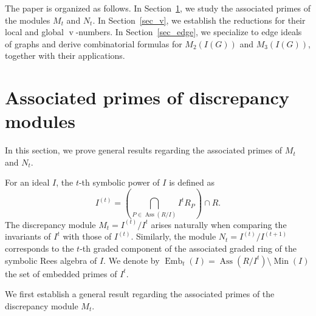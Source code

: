 \documentclass[12pt]{amsart}
\def\v{\operatorname{v}}
\begin{document}
The paper is organized as follows. In Section~\ref{sec_assoc}, we study the associated primes of the modules $M_t$ and $N_t$. In Section~\ref{sec_v}, we establish the reductions for their local and global $\v$-numbers. In Section~\ref{sec_edge}, we specialize to edge ideals of graphs and derive combinatorial formulas for $M_2(I(G))$ and $M_3(I(G))$, together with their applications.



\section{Associated primes of discrepancy modules}\label{sec_assoc}
In this section, we prove general results regarding the associated primes of $M_t$ and $N_t$. 

For an ideal $I$, the $t$-th symbolic power of $I$ is defined as
\[
I^{(t)} = \left( \bigcap_{P \in \operatorname{Ass}(R/I)} I^t R_P \right) \cap R.
\]
The discrepancy module $M_t = I^{(t)} / I^t$ arises naturally when comparing the invariants of $I^t$ with those of $I^{(t)}$. Similarly, the module $N_t = I^{(t)} / I^{(t+1)}$ corresponds to the $t$-th graded component of the associated graded ring of the symbolic Rees algebra of $I$. We denote by $\operatorname{Emb}_t(I) = \operatorname{Ass}(R/I^t) \setminus \operatorname{Min}(I)$ the set of embedded primes of $I^t$.

We first establish a general result regarding the associated primes of the discrepancy module $M_t$.
\end{document}
